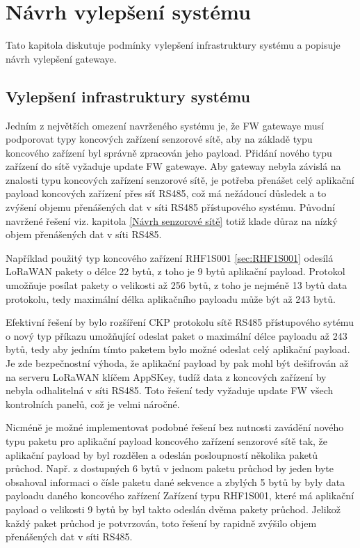 \chapter{Návrh vylepšení systému}
\label{Návrh vylepšení systému}
Tato kapitola diskutuje podmínky vylepšení infrastruktury systému a popisuje návrh vylepšení gatewaye.

\section{Vylepšení infrastruktury systému}
Jedním z největších omezení navrženého systému je, že FW gatewaye musí podporovat typy koncových zařízení senzorové sítě, aby na základě typu koncového zařízení byl správně zpracován jeho payload.
Přidání nového typu zařízení do sítě vyžaduje update FW gatewaye.
Aby gateway nebyla závislá na znalosti typu koncových zařízení senzorové sítě, je potřeba přenášet celý aplikační payload koncových zařízení přes síť RS485, což má nežádoucí důsledek a to zvýšení objemu přenášených dat v síti RS485 přístupového systému.
Původní navržené řešení viz. kapitola \ref{Návrh senzorové sítě} totiž klade důraz na nízký objem přenášených dat v síti RS485.

Například použitý typ koncového zařízení RHF1S001 \ref{sec:RHF1S001} odesílá LoRaWAN pakety o délce 22 bytů, z toho je 9 bytů aplikační payload. Protokol umožňuje posílat pakety o velikosti až 256 bytů, z toho je nejméně 13 bytů data protokolu, tedy maximální délka aplikačního payloadu může být až 243 bytů.

Efektivní řešení by bylo rozšíření CKP protokolu sítě RS485 přístupového sytému o nový typ příkazu umožňující odeslat paket o maximální délce payloadu až 243 bytů, tedy aby jedním tímto paketem bylo možné odeslat celý aplikační payload. 
Je zde bezpečnostní výhoda, že aplikační payload by pak mohl být dešifrován až na serveru LoRaWAN klíčem AppSKey, tudíž data z koncových zařízení by nebyla odhalitelná v síti RS485.
Toto řešení tedy vyžaduje update FW všech kontrolních panelů, což je velmi náročné.

Nicméně je možné implementovat podobné řešení bez nutnosti zavádění nového typu paketu pro aplikační payload koncového zařízení senzorové sítě tak, že aplikační payload by byl rozdělen a odeslán posloupností několika paketů průchod. 
Např. z dostupných 6 bytů v jednom paketu průchod by jeden byte obsahoval informaci o čísle paketu dané sekvence a zbylých 5 bytů by byly data payloadu daného koncového zařízení Zařízení typu RHF1S001, které má aplikační payload o velikosti 9 bytů by byl takto odeslán dvěma pakety průchod. Jelikož každý paket průchod je potvrzován, toto řešení by rapidně zvýšilo objem přenášených dat v síti RS485.



